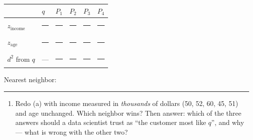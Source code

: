 \documentclass[
  11pt,
]{article}
\providecommand{\tightlist}{%
  \setlength{\itemsep}{0pt}\setlength{\parskip}{0pt}}
\newcommand{\answerspace}[1]{\par\vspace*{#1}}  %
\newcommand{\blank}[1][1.2in]{\rule{#1}{0.4pt}}
\begin{document}
\begin{longtable}[]{@{}
  >{\centering\arraybackslash}p{}
  >{\centering\arraybackslash}p{}
  >{\centering\arraybackslash}p{}
  >{\centering\arraybackslash}p{}
  >{\centering\arraybackslash}p{}
  >{\centering\arraybackslash}p{}@{}}
\toprule\noalign{}
\begin{minipage}[b]{\linewidth}\centering
\end{minipage} & \begin{minipage}[b]{\linewidth}\centering
\(q\)
\end{minipage} & \begin{minipage}[b]{\linewidth}\centering
\(P_1\)
\end{minipage} & \begin{minipage}[b]{\linewidth}\centering
\(P_2\)
\end{minipage} & \begin{minipage}[b]{\linewidth}\centering
\(P_3\)
\end{minipage} & \begin{minipage}[b]{\linewidth}\centering
\(P_4\)
\end{minipage} \\
\midrule\noalign{}
\endhead
\bottomrule\noalign{}
\endlastfoot
\(z_{\text{income}}\) & \blank[0.7in] & \blank[0.7in] & \blank[0.7in] &
\blank[0.7in] & \blank[0.7in] \\
\(z_{\text{age}}\) & \blank[0.7in] & \blank[0.7in] & \blank[0.7in] &
\blank[0.7in] & \blank[0.7in] \\
\(d^2\) from \(q\) & --- & \blank[0.7in] & \blank[0.7in] & \blank[0.7in]
& \blank[0.7in] \\
\end{longtable}

Nearest neighbor: \blank[0.7in]

\answerspace{2in}

\begin{enumerate}
\def\labelenumi{(\alph{enumi})}
\setcounter{enumi}{2}
\tightlist
\item
  Redo (a) with income measured in \emph{thousands} of dollars (50, 52,
  60, 45, 51) and age unchanged. Which neighbor wins? Then answer: which
  of the three answers should a data scientist trust as ``the customer
  most like \(q\)'', and why --- what is wrong with the other two?
\end{enumerate}
\end{document}
